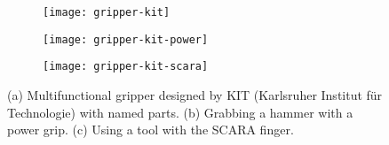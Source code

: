 \documentclass[../root.tex]{subfiles}
\begin{document}
\begin{figure}[tbhp]
	\centering
	\begin{subfigure}[b]{0.8\columnwidth}
		\texttt{[image: gripper-kit]}
		\caption{}
		\label{fig:gripper-kit}
	\end{subfigure}
	
	\begin{subfigure}[b]{0.25\columnwidth}
		\texttt{[image: gripper-kit-power]}
		\caption{}
		\label{fig:gripper-kit-power}
	\end{subfigure}
	\hspace{2cm}
	\begin{subfigure}[b]{0.25\columnwidth}
		\texttt{[image: gripper-kit-scara]}
		\caption{}
		\label{fig:gripper-kit-scara}
	\end{subfigure}
	\caption{
		(a) Multifunctional gripper designed by KIT (Karlsruher Institut für Technologie) with named parts.
		(b) Grabbing a hammer with a power grip.
		(c) Using a tool with the SCARA finger.
	}
\end{figure}
\end{document}
